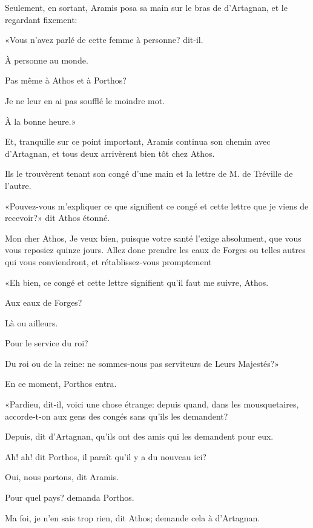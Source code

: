 Seulement, en sortant, Aramis posa sa main sur le bras de d'Artagnan, et le regardant fixement: 

«Vous n'avez parlé de cette femme à personne? dit-il. 

\speak  À personne au monde. 

\speak  Pas même à Athos et à Porthos? 

\speak  Je ne leur en ai pas soufflé le moindre mot. 

\speak  À la bonne heure.» 

Et, tranquille sur ce point important, Aramis continua son chemin avec d'Artagnan, et tous deux arrivèrent bien tôt chez Athos. 

Ils le trouvèrent tenant son congé d'une main et la lettre de M. de Tréville de l'autre. 

«Pouvez-vous m'expliquer ce que signifient ce congé et cette lettre que je viens de recevoir?» dit Athos étonné. 

\begin{mail}{}{Mon cher Athos,}
Je veux bien, puisque votre santé l'exige absolument, que vous vous reposiez quinze jours. Allez donc prendre les eaux de Forges ou telles autres qui vous conviendront, et rétablissez-vous promptement 

\end{mail}


«Eh bien, ce congé et cette lettre signifient qu'il faut me suivre, Athos. 

\speak  Aux eaux de Forges? 

\speak  Là ou ailleurs. 

\speak  Pour le service du roi? 

\speak  Du roi ou de la reine: ne sommes-nous pas serviteurs de Leurs Majestés?» 

En ce moment, Porthos entra. 

«Pardieu, dit-il, voici une chose étrange: depuis quand, dans les mousquetaires, accorde-t-on aux gens des congés sans qu'ils les demandent? 

\speak  Depuis, dit d'Artagnan, qu'ils ont des amis qui les demandent pour eux. 

\speak  Ah! ah! dit Porthos, il paraît qu'il y a du nouveau ici? 

\speak  Oui, nous partons, dit Aramis. 

\speak  Pour quel pays? demanda Porthos. 

\speak  Ma foi, je n'en sais trop rien, dit Athos; demande cela à d'Artagnan. 

